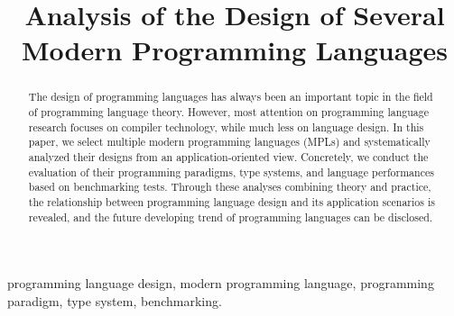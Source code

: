 \documentclass[10pt,conference,letterpaper]{IEEEtran}
\begin{document}
    \title{Analysis of the Design of Several Modern Programming Languages\\
    }

    \author{
    }

    \maketitle

    \begin{abstract}
        The design of programming languages has always been an important topic in the field of programming language theory. However, most attention on programming language research focuses on compiler technology, while much less on language design. In this paper, we select multiple modern programming languages (MPLs) and systematically analyzed their designs from an application-oriented view. Concretely, we conduct the evaluation of their programming paradigms, type systems, and language performances based on benchmarking tests. Through these analyses combining theory and practice, the relationship between programming language design and its application scenarios is revealed, and the future developing trend of programming languages can be disclosed.
    \end{abstract}

    \begin{IEEEkeywords}
        programming language design,
        modern programming language,
        programming paradigm,
        type system,
        benchmarking.
    \end{IEEEkeywords}


    
    
    
    
    
    
\end{document}
